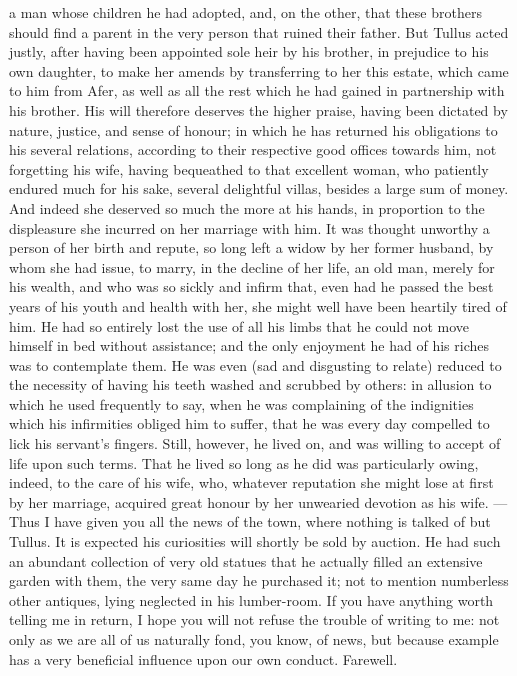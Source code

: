 a man whose children he had adopted, and, on the other, that these
brothers should find a parent in the very person that ruined their father.
But Tullus acted justly, after having been appointed sole heir by his
brother, in prejudice to his own daughter, to make her amends by
transferring to her this estate, which came to him from Afer, as well as
all the rest which he had gained in partnership with his brother. His will
therefore deserves the higher praise, having been dictated by nature,
justice, and sense of honour; in which he has returned his obligations to
his several relations, according to their respective good offices towards
him, not forgetting his wife, having bequeathed to that excellent woman,
who patiently endured much for his sake, several delightful villas,
besides a large sum of money. And indeed she deserved so much the more at
his hands, in proportion to the displeasure she incurred on her marriage
with him. It was thought unworthy a person of her birth and repute, so
long left a widow by her former husband, by whom she had issue, to marry,
in the decline of her life, an old man, merely for his wealth, and who was
so sickly and infirm that, even had he passed the best years of his youth
and health with her, she might well have been heartily tired of him. He
had so entirely lost the use of all his limbs that he could not move
himself in bed without assistance; and the only enjoyment he had of his
riches was to contemplate them. He was even (sad and disgusting to relate)
reduced to the necessity of having his teeth washed and scrubbed by
others: in allusion to which he used frequently to say, when he was
complaining of the indignities which his infirmities obliged him to
suffer, that he was every day compelled to lick his servant's fingers.
Still, however, he lived on, and was willing to accept of life upon such
terms. That he lived so long as he did was particularly owing, indeed, to
the care of his wife, who, whatever reputation she might lose at first by
her marriage, acquired great honour by her unwearied devotion as his wife.
— Thus I have given you all the news of the town, where nothing is
talked of but Tullus. It is expected his curiosities will shortly be sold
by auction. He had such an abundant collection of very old statues that he
actually filled an extensive garden with them, the very same day he
purchased it; not to mention numberless other antiques, lying neglected in
his lumber-room. If you have anything worth telling me in return, I hope
you will not refuse the trouble of writing to me: not only as we are all
of us naturally fond, you know, of news, but because example has a very
beneficial influence upon our own conduct. Farewell.

